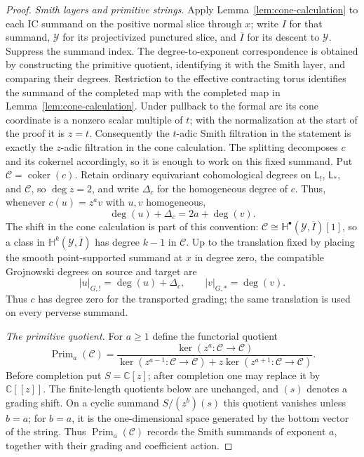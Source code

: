 \documentclass[11pt]{amsart}
\theoremstyle{definition}
\theoremstyle{remark}
\begin{document}
\begin{proof}
\smallskip
\noindent\emph{Smith layers and primitive strings.}
Apply Lemma~\ref{lem:cone-calculation} to each IC summand on the positive
normal slice through $x$; write $I$ for that summand,
$\mathcal Y$ for its projectivized punctured slice, and $\overline I$ for its
descent to $\mathcal Y$.  Suppress the summand index.  The
degree-to-exponent correspondence is obtained by constructing the primitive
quotient, identifying it with the Smith layer, and comparing their degrees.
Restriction to the effective contracting torus identifies the summand of
the completed map with the completed map in
Lemma~\ref{lem:cone-calculation}.  Under pullback to the formal arc its cone
coordinate is a nonzero scalar multiple of $t$; with the normalization at
the start of the proof it is $z=t$.  Consequently the $t$-adic Smith
filtration in the statement is exactly the $z$-adic filtration in the cone
calculation.  The splitting decomposes $c$ and its cokernel accordingly, so
it is enough to work on this fixed summand.
Put $\mathcal C=\operatorname{coker}(c)$.
Retain ordinary equivariant cohomological degrees on $\mathsf L_!$,
$\mathsf L_*$, and
$\mathcal C$, so $\deg z=2$, and write $\Delta_c$ for the homogeneous degree
of $c$.
Thus, whenever $c(u)=z^av$ with $u,v$ homogeneous,
\begin{equation}\label{eq:degree-balance}
 \deg(u)+\Delta_c=2a+\deg(v).
\end{equation}
The shift in the cone calculation is part of this convention:
$\mathcal C\cong\mathbb H^\bullet(\mathcal Y,\overline I)[1]$, so a class in
$\mathbb H^k(\mathcal Y,\overline I)$ has degree $k-1$ in $\mathcal C$.
Up to the translation fixed by placing the smooth point-supported summand
at $x$ in degree zero, the compatible Grojnowski degrees on source and
target are
\begin{equation}\label{eq:grojnowski-source-degree}
 |u|_{G,!}=\deg(u)+\Delta_c,
 \qquad |v|_{G,*}=\deg(v).
\end{equation}
Thus $c$ has degree zero for the transported grading; the same
translation is used on every perverse summand.

\smallskip
\noindent\emph{The primitive quotient.}
For $a\geq1$ define the functorial quotient
\begin{equation}\label{eq:primitive-string-quotient}
 \operatorname{Prim}_a(\mathcal C)=
 \frac{\ker(z^a:\mathcal C\to\mathcal C)}
 {\ker(z^{a-1}:\mathcal C\to\mathcal C)+
  z\ker(z^{a+1}:\mathcal C\to\mathcal C)}.
\end{equation}
Before completion put $S=\mathbb C[z]$; after completion one may replace it
by $\mathbb C[[z]]$.  The finite-length quotients below are unchanged, and
$(s)$ denotes a grading shift.  On a cyclic summand $S/(z^b)(s)$ this quotient
vanishes unless $b=a$; for
$b=a$, it is the one-dimensional space generated by the bottom vector of the
string.  Thus $\operatorname{Prim}_a(\mathcal C)$ records the Smith summands
of exponent $a$, together with their grading and coefficient action.


\end{proof}
\end{document}
